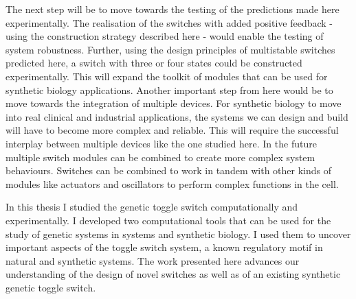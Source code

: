 The next step will be to move towards the testing of the predictions made here experimentally. The realisation of the switches with added positive feedback - using the construction strategy described here - would enable the testing of system robustness. Further, using the design principles of multistable switches predicted here, a switch with three or four states could be constructed experimentally. This will expand the toolkit of modules that can be used for synthetic biology applications. Another important step from here would be to move towards the integration of multiple devices. For synthetic biology to move into real clinical and industrial applications, the systems we can design and build will have to become more complex and reliable. This will require the successful interplay between multiple devices like the one studied here. In the future multiple switch modules can be combined to create more complex system behaviours. Switches can be combined to work in tandem with other kinds of modules like actuators and oscillators to perform complex functions in the cell. 


In this thesis I studied the genetic toggle switch computationally and experimentally. I developed two computational tools that can be used for the study of genetic systems in systems and synthetic biology. I used them to uncover important aspects of the toggle switch system, a known regulatory motif in natural and synthetic systems. The work presented here advances our understanding of the design of novel switches as well as of an existing synthetic genetic toggle switch.



